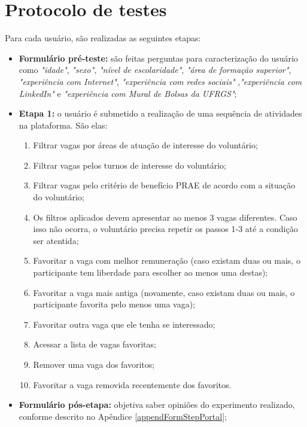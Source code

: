 \section{Protocolo de testes}
\label{avaliacaoProtocolo}

Para cada usuário, são realizadas as seguintes etapas:

\begin{itemize}
    \item \textbf{Formulário pré-teste:} são feitas perguntas para caracterização do usuário como \textit{"idade"}, \textit{"sexo"}, \textit{"nível de escolaridade"}, \textit{"área de formação superior"}, \textit{"experiência com Internet"}, \textit{"experiência com redes sociais"} ,\textit{"experiência com LinkedIn"} e \textit{"experiência com Mural de Bolsas da UFRGS"};
    
    \item \textbf{Etapa 1:} o usuário é submetido a realização de uma sequência de atividades na plataforma. São elas:
        \begin{enumerate}
            \item Filtrar vagas por áreas de atuação de interesse do voluntário;
            \item Filtrar vagas pelos turnos de interesse do voluntário;
            \item Filtrar vagas pelo critério de benefício PRAE de acordo com a situação do voluntário;
            \item Os filtros aplicados devem apresentar ao menos 3 vagas diferentes. Caso isso não ocorra, o voluntário precisa repetir os passos 1-3 até a condição ser atentida;
            \item Favoritar a vaga com melhor remuneração (caso existam duas ou mais, o participante tem liberdade para escolher ao menos uma destas);
            \item Favoritar a vaga mais antiga (novamente, caso existam duas ou mais, o participante favorita pelo menos uma vaga);
            \item Favoritar outra vaga que ele tenha se interessado;
            \item Acessar a lista de vagas favoritas;
            \item Remover uma vaga dos favoritos;
            \item Favoritar a vaga removida recentemente dos favoritos.
        \end{enumerate}
        
    \item \textbf{Formulário pós-etapa:} objetiva saber opiniões do experimento realizado, conforme descrito no Apêndice \ref{appendFormStepPortal};
    

\end{itemize}

